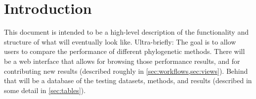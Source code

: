 \section{Introduction}

This document is intended to be a high-level description of the functionality and structure of what \phycomb will eventually look like.
Ultra-briefly:
The goal is to allow users to compare the performance of different phylogenetic methods.
There will be a web interface that allows for browsing those performance results, and for contributing new results (described roughly in \cref{sec:workflows,sec:views}).
Behind that will be a database of the testing datasets, methods, and results (described in some detail in \cref{sec:tables}).

